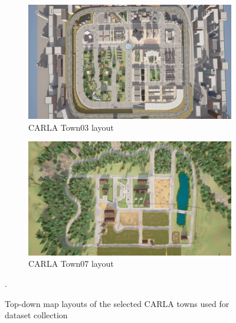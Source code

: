 \begin{figure}[htbp]
    \centering
    \begin{subfigure}{0.48\textwidth}
        \centering
        \includegraphics[width=\linewidth]{img/carla/town03.png}
        \caption{CARLA Town03 layout}
    \end{subfigure}
    \hfill
    \begin{subfigure}{0.48\textwidth}
        \centering
        \includegraphics[width=\linewidth]{img/carla/town_7.png}
        \caption{CARLA Town07 layout}
    \end{subfigure}
    \caption{Top-down map layouts of the selected CARLA towns used for dataset collection~\cite{CARLA2024}}.
    \label{fig:carla_maps}
\end{figure}

